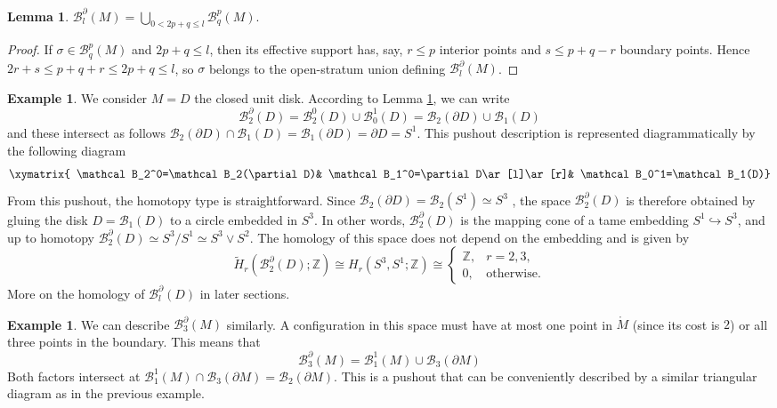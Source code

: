 \documentclass[11pt,a4paper]{article}
\numberwithin{equation}{section}
\newtheorem{lem}[thm]{Lemma}
\theoremstyle{definition}
\newtheorem{exa}[thm]{Example}
\theoremstyle{remark}
\newcommand{\Z}{\mathbb{Z}}
\newcommand{\pa}{\partial}
\newcommand{\wt}{\widetilde}
\newcommand{\BB}{\mathcal B}
\begin{document}
\begin{lem}\label{lem:closed-strata} $\displaystyle
\BB_l^{\pa}(M)=\bigcup_{0<2p+q\le l}\BB_q^p(M).$
\end{lem}

\begin{proof} If \(\sigma\in\BB_q^p(M)\) and \(2p+q\le l\), then its effective support has, say, \(r\le p\) interior points and \(s\le p+q-r\) boundary points.  Hence \(2r+s\le p+q+r\le2p+q\le l\), so \(\sigma\) belongs to the open-stratum union defining \(\BB_l^{\pa}(M)\).
\end{proof}

\begin{exa}\rm \label{rem:not-homotopy-invariant} We consider $M=D$  the closed unit disk. According to Lemma \ref{lem:closed-strata}, we can write
$$
\BB_2^{\pa}(D)= \BB_2^0(D)\cup \BB^1_0(D) =\BB_2(\pa D)\cup \BB_1(D) $$
and these intersect as follows
$\BB_2(\pa D)\cap \BB_1(D)=\BB_1(\pa D)=\pa D = S^1.$ This pushout description is represented diagrammatically by the following diagram
$$\xymatrix{
\BB_2^0=\BB_2(\pa D)&
\BB_1^0=\pa D\ar[l]\ar[r]&
\BB_0^1=\BB_1(D)}$$
From this pushout, the homotopy type is straightforward. Since \(\BB_2(\pa D) = \BB_2(S^1)\simeq S^3\) \cite[Corollary 1.4(b)]{KallelKaroui2011}, the space $\BB_2^\partial (D)$ is therefore obtained by gluing the disk $D=\BB_1(D)$ to a circle embedded in \(S^3\).  In other words, $\BB_2^\partial (D)$ is the mapping cone of a tame embedding $S^1\hookrightarrow S^3$, and up to homotopy 
$\BB_2^\partial (D)\simeq S^3/S^1\simeq S^3\vee S^2$.
The homology of this space does not depend on the embedding and is given by
\[
\wt H_r(\BB_2^{\pa}(D);\Z)\cong H_r(S^3,S^1;\Z)\cong
\begin{cases}
\Z,& r=2,3,\\
0,& \text{otherwise}.
\end{cases}
\]
More on the homology of $\BB_l^\partial (D)$ in later sections.
\end{exa}

\begin{exa}\rm 
We can describe $\BB_3^\pa (M)$ similarly. A configuration in this space must have at most one point in $\mathring{M}$ (since its cost is $2$) or all three points in the boundary. This means that
$$\BB_3^\pa (M) = \BB^1_1(M)\cup \BB_3(\partial M)$$
Both factors intersect at 
$\BB^1_1(M)\cap \BB_3(\partial M) = \BB_2(\pa M)$. This is a pushout that can be conveniently described by a similar triangular diagram as in the previous example.
\end{exa}
\end{document}
